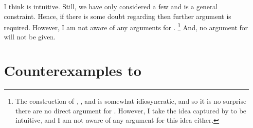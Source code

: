 \begin{note}
  I think \issueInclusion{} is intuitive.
  Still, we have only considered a few  and \issueInclusion{} is a general constraint.
  Hence, if there is some doubt regarding \issueInclusion{} then further argument is required.
  However, I am not aware of any arguments for \issueInclusion{}.%
  \footnote{
    The construction of \qWhy{}, \qHow{}, and \issueInclusion{} is somewhat idiosyncratic, and so it is no surprise there are no direct argument for \issueInclusion{}.
    However, I take the idea captured by \issueInclusion{} to be intuitive, and I am not aware of any argument for this idea either.
  }
  And, no argument for \issueInclusion{} will not be given.
\end{note}



\section*{Counterexamples to \issueInclusion{}}


